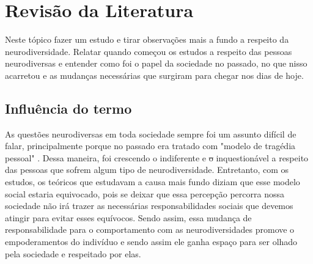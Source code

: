 \documentclass[
    12pt,               %
    openright,          %
    oneside,
    a4paper,            %
    paginasA3,  %
    BIBLATEX,           %
    REFINDENT,          %
    MODELO,             %
    TODO,               %
    english,            %
    brazil              %
    ]{ifsp-spo-inf-ctds} %
\providecommand{\DIFadd}[1]{{\protect\color{blue}\uwave{#1}}} %
\providecommand{\DIFdel}[1]{{\protect\color{red}\sout{#1}}}                      %
\providecommand{\DIFaddbegin}{} %
\providecommand{\DIFaddend}{} %
\providecommand{\DIFdelbegin}{} %
\providecommand{\DIFdelend}{} %
\begin{document}

\DIFdelend \chapter{Revisão da Literatura}
\DIFaddbegin 

\DIFaddend Neste tópico \DIFaddbegin \DIFadd{iremos }\DIFaddend fazer um estudo e tirar observações mais a fundo a respeito da neurodiversidade. Relatar quando começou os estudos a respeito das pessoas neurodiversas e
entender como foi o papel da sociedade no passado, no que nisso acarretou e as mudanças necessárias que surgiram para chegar nos dias de hoje.
\DIFaddbegin 

\DIFaddend \section{Influência do termo}
As questões neurodiversas em toda sociedade sempre foi um assunto difícil de falar, principalmente porque no passado era tratado com "modelo de tragédia pessoal" \cite{oliver1990politics}. Dessa maneira, foi crescendo o indiferente e \DIFdelbegin \DIFdel{o }\DIFdelend inquestionável a respeito das pessoas que sofrem algum tipo de neurodiversidade. Entretanto, com os estudos, os teóricos que estudavam a causa mais fundo diziam que esse modelo social estaria equivocado, pois se deixar que essa percepção percorra nossa sociedade não irá trazer as necessárias responsabilidades sociais que devemos atingir para evitar esses equívocos. Sendo assim, essa mudança de responsabilidade para o comportamento com as neurodiversidades promove o empoderamentos do indivíduo e sendo assim ele ganha espaço para ser olhado pela sociedade e respeitado por elas.
\end{document}
